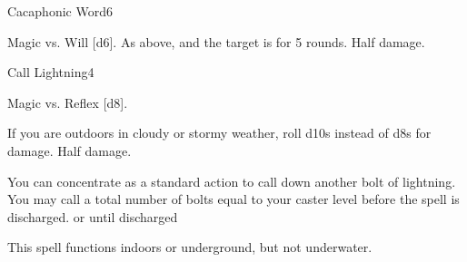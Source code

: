 \begin{spellsection}{Cacaphonic Word}{6}
\begin{spellheader}
\end{spellheader}
\begin{spellcontent}
    \begin{spelltargetinginfo}
    \end{spelltargetinginfo}
    \begin{spelleffects}
        \begin{spellattack}{Magic vs. Will}
            \spellsuccess {}[d6].
            \spellcritical As above, and the target is \disoriented for 5 rounds.
            \spellfailure Half damage.
        \end{spellattack}
    \end{spelleffects}
\end{spellcontent}
\begin{spellfooter}
\end{spellfooter}
\end{spellsection}

\begin{spellsection}{Call Lightning}{4}
\begin{spellheader}
\end{spellheader}
\begin{spellcontent}
    \begin{spelltargetinginfo}
    \end{spelltargetinginfo}
    \begin{spelleffects}
        \begin{spellattack}{Magic vs. Reflex}
            \spellsuccess {}[d8].
            
            If you are outdoors in cloudy or stormy weather, roll d10s instead of d8s for damage.
            \spellfailure Half damage.
        \end{spellattack}
        \spelleffect You can concentrate as a standard action to call down another bolt of lightning. You may call a total number of bolts equal to your caster level before the spell is discharged.
        \spelldur \durmed or until discharged \dismissable
    \end{spelleffects}
\end{spellcontent}
\begin{spellfooter}
    \spellnotes This spell functions indoors or underground, but not underwater. \destructivespellnotes
\end{spellfooter}
\end{spellsection}

